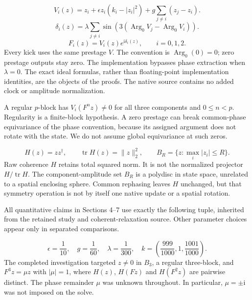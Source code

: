 \documentclass[11pt,a4paper]{article}
\begin{document}
\begin{equation}V_i(z)=z_i+\epsilon z_i(k_i-|z_i|^2)+g\sum_{j\neq i}(z_j-z_i).\end{equation}
\begin{equation}\delta_i(z)=\lambda\sum_{j\neq i}\sin\left(3(\operatorname{Arg}_0 V_j-\operatorname{Arg}_0 V_i)\right).\end{equation}
\begin{equation}F_i(z)=V_i(z)e^{\mathrm{i}\delta_i(z)},\qquad i=0,1,2.\end{equation}
Every kick uses the same prestage $V$. The convention is $\operatorname{Arg}_0(0)=0$; zero prestage outputs stay zero. The implementation bypasses phase extraction when $\lambda=0$. The exact ideal formulas, rather than floating-point implementation identities, are the objects of the proofs. The native source contains no added clock or amplitude normalization.

A regular $p$-block has $V_i(F^n z)\neq0$ for all three components and $0\leq n<p$. Regularity is a finite-block hypothesis. A zero prestage can break common-phase equivariance of the phase convention, because its assigned argument does not rotate with the state. We do not assume global equivariance at such zeros. \cite{OBS}

\begin{equation}H(z)=zz^\dagger,\qquad \operatorname{tr}H(z)=\|z\|_2^2,\qquad B_R=\{z:\max_i|z_i|\leq R\}.\end{equation}
Raw coherence $H$ retains total squared norm. It is not the normalized projector $H/\operatorname{tr}H$. The component-amplitude set $B_R$ is a polydisc in state space, unrelated to a spatial enclosing sphere. Common rephasing leaves $H$ unchanged, but that symmetry operation is not by itself one native update or a spatial rotation.

All quantitative claims in Sections 4–7 use exactly the following tuple, inherited from the retained study and coherent-relaxation source. Other parameter choices appear only in separated comparisons. \cite{COH} \cite{D03}

\begin{equation}\epsilon=\frac{1}{10},\quad g=\frac{1}{60},\quad\lambda=\frac{1}{300},\quad k=\left(\frac{999}{1000},1,\frac{1001}{1000}\right).\end{equation}
The completed investigation targeted $z\neq0$ in $B_3$, a regular three-block, and $F^3z=\mu z$ with $|\mu|=1$, where $H(z)$, $H(Fz)$ and $H(F^2z)$ are pairwise distinct. The phase remainder $\mu$ was unknown throughout. In particular, $\mu=\pm\mathrm{i}$ was not imposed on the solve.
\end{document}
